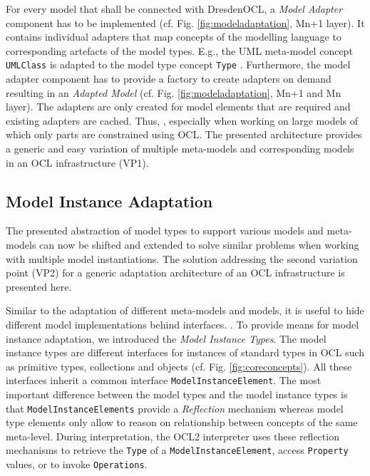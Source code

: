 	For every model that shall be connected with DresdenOCL, 
	a \emph{Model Adapter} component has to be implemented (cf. Fig. \ref{fig:modeladaptation}, Mn+1 layer). 
	It contains individual adapters that map concepts of the modelling
	language to corresponding artefacts of the model types. E.g., the UML
	meta-model concept \texttt{UMLClass} is adapted to the model type concept
	\texttt{Type} . 
	Furthermore, the model adapter component has to provide a factory to create 
	adapters on demand resulting in an \textit{Adapted Model} (cf. Fig.
	\ref{fig:modeladaptation}, Mn+1 and Mn layer).
	The adapters are only created for model elements that are required and
	existing adapters are cached. Thus, , 
	especially when working on large models of which only parts are constrained using OCL.
	The presented architecture provides a generic and easy variation of multiple meta-models
	and corresponding models in an OCL infrastructure (VP1).


\subsection{Model Instance Adaptation}
	
	The presented abstraction of model types to support various models
	and meta-models can now be shifted and extended to
	solve similar problems when working with multiple model instantiations. The 
	solution addressing the second variation point (VP2) for a generic adaptation
	architecture of an OCL infrastructure is presented here.
	
	Similar to the adaptation of different meta-models and models, it is
	useful to hide different model implementations
	behind  interfaces. . To provide means for model
	instance adaptation, we introduced the \emph{Model Instance
	Types}.  The model instance types are different
	interfaces for instances of standard types in OCL such as primitive types, 
	collections and objects (cf. Fig. \ref{fig:coreconcepts}). 
	All these	interfaces inherit a common interface \texttt{ModelInstanceElement}. The most 
	important difference between the model types and the model instance types
	is that \texttt{ModelInstanceElements} provide a \emph{Reflection} \cite{maesOOPSLA87} mechanism whereas 
	model type elements only allow to reason on relationship between concepts of
	the same meta-level. During interpretation, the OCL2 interpreter uses these reflection mechanisms to
	retrieve the \texttt{Type} of a \texttt{ModelInstanceElement}, access \texttt{Property}
	values, or to invoke \texttt{Operations}.
	
